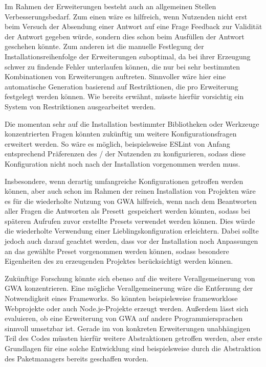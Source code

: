 Im Rahmen der Erweiterungen besteht auch an allgemeinen Stellen Verbesserungsbedarf. Zum einen wäre es hilfreich, wenn Nutzenden nicht erst beim Versuch der Absendung einer Antwort auf eine Frage Feedback zur Validität der Antwort gegeben würde, sondern dies schon beim Ausfüllen der Antwort geschehen könnte. Zum anderen ist die manuelle Festlegung der Installationsreihenfolge der Erweiterungen suboptimal, da bei ihrer Erzeugung schwer zu findende Fehler unterlaufen können, die nur bei sehr bestimmten Kombinationen von Erweiterungen auftreten. Sinnvoller wäre hier eine automatische Generation basierend auf Restriktionen, die pro Erweiterung festgelegt werden können. Wie bereits erwähnt, müsste hierfür vorsichtig ein System von Restriktionen ausgearbeitet werden.

Die momentan sehr auf die Installation bestimmter Bibliotheken oder Werkzeuge konzentrierten Fragen könnten zukünftig um weitere Konfigurationsfragen erweitert werden. So wäre es möglich, beispielsweise ESLint von Anfang entsprechend Präferenzen des / der Nutzenden zu konfigurieren, sodass diese Konfiguration nicht noch nach der Installation vorgenommen werden muss.

Insbesondere, wenn derartig umfangreiche Konfigurationen getroffen werden können, aber auch schon im Rahmen der reinen Installation von Projekten wäre es für die wiederholte Nutzung von \gls{GWA} hilfreich, wenn nach dem Beantworten aller Fragen die Antworten als \glqq Presett\grqq\ gespeichert werden könnten, sodass bei späteren Aufrufen zuvor erstellte Presets verwendet werden können. Dies würde die wiederholte Verwendung einer Lieblingskonfiguration erleichtern. Dabei sollte jedoch auch darauf geachtet werden, dass vor der Installation noch Anpassungen an das gewählte Preset vorgenommen werden können, sodass besondere Eigenheiten des zu erzeugenden Projektes berücksichtigt werden können.

Zukünftige Forschung könnte sich ebenso auf die weitere Verallgemeinerung von \gls{GWA} konzentrieren. Eine mögliche Verallgemeinerung wäre die Entfernung der Notwendigkeit eines Frameworks. So könnten beispielsweise frameworklose Webprojekte oder auch Node.js-Projekte erzeugt werden. Außerdem lässt sich evaluieren, ob eine Erweiterung von \gls{GWA} auf andere Programmiersprachen sinnvoll umsetzbar ist. Gerade im von konkreten Erweiterungen unabhängigen Teil des Codes müssten hierfür weitere Abstraktionen getroffen werden, aber erste Grundlagen für eine solche Entwicklung sind beispielsweise durch die Abstraktion des Paketmanagers bereits geschaffen worden.